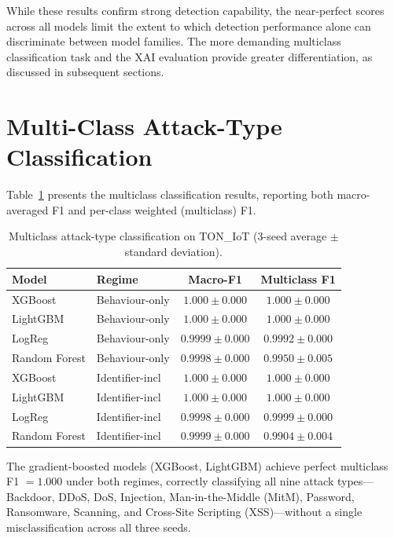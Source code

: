 \documentclass[12pt,a4paper]{report}
\begin{document}
While these results confirm strong detection capability, the near-perfect scores across all models limit the extent to which detection performance alone can discriminate between model families. The more demanding multiclass classification task and the XAI evaluation provide greater differentiation, as discussed in subsequent sections.

\section{Multi-Class Attack-Type Classification}
\label{sec:multiclass-results}

Table~\ref{tab:multiclass} presents the multiclass classification results, reporting both macro-averaged F1 and per-class weighted (multiclass) F1.

\begin{table}[H]
\centering
\caption{Multiclass attack-type classification on TON\_IoT (3-seed average $\pm$ standard deviation).}
\label{tab:multiclass}
\begin{tabular}{llcc}
\toprule
\textbf{Model} & \textbf{Regime} & \textbf{Macro-F1} & \textbf{Multiclass F1} \\
\midrule
XGBoost & Behaviour-only & $1.000 \pm 0.000$ & $1.000 \pm 0.000$ \\
LightGBM & Behaviour-only & $1.000 \pm 0.000$ & $1.000 \pm 0.000$ \\
LogReg & Behaviour-only & $0.9999 \pm 0.000$ & $0.9992 \pm 0.000$ \\
Random Forest & Behaviour-only & $0.9998 \pm 0.000$ & $0.9950 \pm 0.005$ \\
\midrule
XGBoost & Identifier-incl & $1.000 \pm 0.000$ & $1.000 \pm 0.000$ \\
LightGBM & Identifier-incl & $1.000 \pm 0.000$ & $1.000 \pm 0.000$ \\
LogReg & Identifier-incl & $0.9998 \pm 0.000$ & $0.9999 \pm 0.000$ \\
Random Forest & Identifier-incl & $0.9999 \pm 0.000$ & $0.9904 \pm 0.004$ \\
\bottomrule
\end{tabular}
\end{table}

The gradient-boosted models (XGBoost, LightGBM) achieve perfect multiclass F1 $= 1.000$ under both regimes, correctly classifying all nine attack types---Backdoor, DDoS, DoS, Injection, Man-in-the-Middle (MitM), Password, Ransomware, Scanning, and Cross-Site Scripting (XSS)---without a single misclassification across all three seeds.
\end{document}
